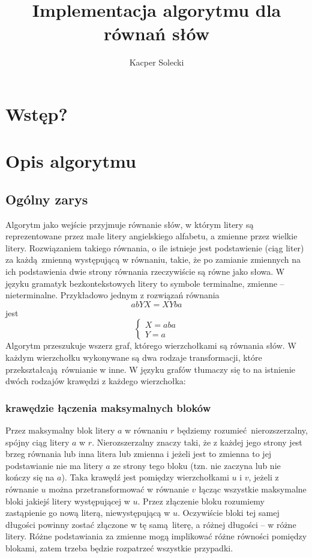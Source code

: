 \documentclass[leqno, 12pt]{article}
\title{Implementacja algorytmu dla równań słów}
\author{Kacper Solecki}
\date{}
\begin{document}
\maketitle

\section{Wstęp?}
\section{Opis algorytmu}

\subsection{Ogólny zarys}
Algorytm jako wejście przyjmuje równanie słów, w którym litery są reprezentowane przez małe litery angielskiego alfabetu, a zmienne przez wielkie litery. Rozwiązaniem takiego równania, o ile istnieje jest podstawienie (ciąg liter) za każdą zmienną występującą w równaniu, takie, że po zamianie zmiennych na ich podstawienia dwie strony równania rzeczywiście są równe jako słowa. W języku gramatyk bezkontekstowych litery to symbole terminalne, zmienne -- nieterminalne. 
\newline
Przykładowo jednym z rozwiązań równania $$abYX = XYba$$ jest
$$
\begin{cases}
X = aba \\
Y = a
\end{cases}
$$
Algorytm przeszukuje wszerz graf, którego wierzchołkami są równania słów. 
W każdym wierzchołku wykonywane są dwa rodzaje transformacji, które przekształcają równianie w inne. W języku grafów tłumaczy się to na istnienie dwóch rodzajów krawędzi z każdego wierzchołka:

\subsubsection*{krawędzie łączenia maksymalnych bloków}
Przez maksymalny blok litery $a$ w równaniu $r$ będziemy rozumieć nierozszerzalny, spójny ciąg litery $a$ w $r$. Nierozszerzalny znaczy taki, że z każdej jego strony jest brzeg równania lub inna litera lub zmienna i jeżeli jest to zmienna to jej podstawianie nie ma litery $a$ ze strony tego bloku (tzn. nie zaczyna lub nie kończy się na $a$).
\newline \newline
Taka krawędź jest pomiędzy wierzchołkami $u$ i $v$, jeżeli z równanie $u$ można przetransformować w równanie $v$ łącząc wszystkie maksymalne bloki jakiejś litery występującej w $u$. Przez złączenie bloku rozumiemy zastąpienie go nową literą, niewystępującą w $u$. Oczywiście bloki tej samej długości powinny zostać złączone w tę samą literę, a różnej długości -- w różne litery.
Różne podstawiania za zmienne mogą implikować różne równości pomiędzy blokami, zatem trzeba będzie rozpatrzeć wszystkie przypadki.
\end{document}
